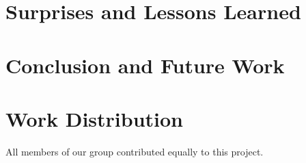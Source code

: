 \documentclass{vldb}
\begin{document}

\section{Surprises and Lessons Learned}


\section{Conclusion and Future Work}


\section{Work Distribution}

All members of our group contributed equally to this project.


\newcommand{\newblock}{}

\newpage
\balance


\end{document}

